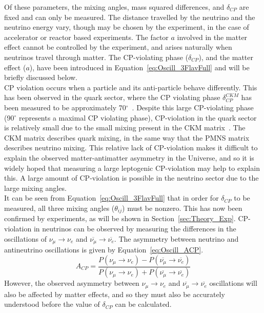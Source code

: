 Of these parameters, the mixing angles, mass squared differences, and $\delta_{CP}$ are fixed and can only be measured. The distance travelled by the neutrino and the neutrino energy vary, though may be chosen by the experiment, in the case of accelerator or reactor based experiments. The factor $a$ involved in the matter effect cannot be controlled by the experiment, and arises naturally when neutrinos travel through matter. The CP-violating phase ($\delta_{CP}$), and the matter effect ($a$), have been introduced in Equation~\ref{eq:Oscill_3FlavFull} and will be briefly discussed below. \\

CP violation occurs when a particle and its anti-particle behave differently. This has been observed in the quark sector, where the CP violating phase $\delta^{CKM}_{CP}$ has been measured to be approximately 70$^{\circ}$~\citep{PDGReview}. Despite this large CP-violating phase (90$^{\circ}$ represents a maximal CP violating phase), CP-violation in the quark sector is relatively small due to the small mixing present in the CKM matrix~\citep{PhysRevLett.10.531, Kobayashi:1973fv}. The CKM matrix describes quark mixing, in the same way that the PMNS matrix describes neutrino mixing. This relative lack of CP-violation makes it difficult to explain the observed matter-antimatter asymmetry in the Universe, and so it is widely hoped that measuring a large leptogenic CP-violation may help to explain this. A large amount of CP-violation is possible in the neutrino sector due to the large mixing angles. \\ 

It can be seen from Equation~\ref{eq:Oscill_3FlavFull} that in order for $\delta_{CP}$ to be measured, all three mixing angles ($\theta_{ij}$) must be nonzero. This has now been confirmed by experiments, as will be shown in Section~\ref{sec:Theory_Exp}. CP-violation in neutrinos can be observed by measuring the differences in the oscillations of $\nu_{\mu}\rightarrow\nu_{e}$ and $\overline{\nu_{\mu}}\rightarrow\overline{\nu_{e}}$. The asymmetry between neutrino and antineutrino oscillations is given by Equation~\ref{eq:Oscill_ACP}.
\begin{equation}
  \label{eq:Oscill_ACP}
  A_{CP} = \frac{ P(\nu_{\mu}\rightarrow\nu_{e}) - P(\overline{\nu_{\mu}}\rightarrow\overline{\nu_{e}}) } { P(\nu_{\mu}\rightarrow\nu_{e}) + P(\overline{\nu_{\mu}}\rightarrow\overline{\nu_{e}}) }
\end{equation}
However, the observed asymmetry between $\nu_{\mu}\rightarrow\nu_{e}$ and $\overline{\nu_{\mu}}\rightarrow\overline{\nu_{e}}$ oscillations will also be affected by matter effects, and so they must also be accurately understood before the value of $\delta_{CP}$ can be calculated. \\


